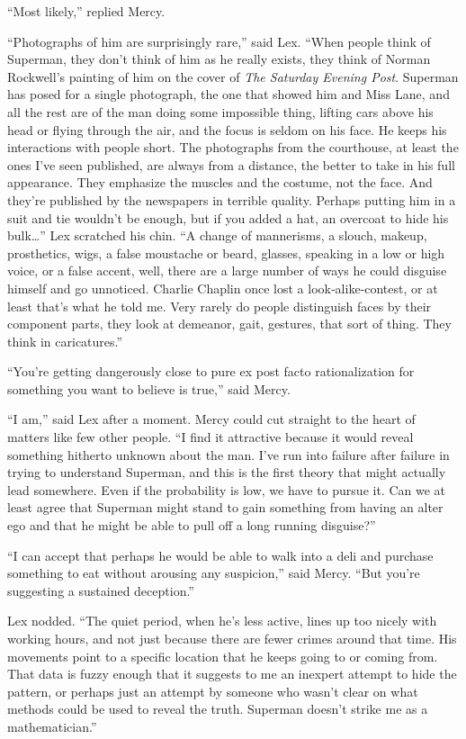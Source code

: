 \documentclass[ebook,12pt]{memoir}
\begin{document}
``Most likely,'' replied Mercy.

``Photographs of him are surprisingly rare,'' said Lex. ``When people
think of Superman, they don't think of him as he really exists, they
think of Norman Rockwell's painting of him on the cover of \emph{The
Saturday Evening Post}. Superman has posed for a single photograph, the
one that showed him and Miss Lane, and all the rest are of the man doing
some impossible thing, lifting cars above his head or flying through the
air, and the focus is seldom on his face. He keeps his interactions with
people short. The photographs from the courthouse, at least the ones
I've seen published, are always from a distance, the better to take in
his full appearance. They emphasize the muscles and the costume, not the
face. And they're published by the newspapers in terrible quality.
Perhaps putting him in a suit and tie wouldn't be enough, but if you
added a hat, an overcoat to hide his bulk\ldots{}'' Lex scratched his
chin. ``A change of mannerisms, a slouch, makeup, prosthetics, wigs, a
false moustache or beard, glasses, speaking in a low or high voice, or a
false accent, well, there are a large number of ways he could disguise
himself and go unnoticed. Charlie Chaplin once lost a
look‐alike‐contest, or at least that's what he told me. Very rarely do
people distinguish faces by their component parts, they look at
demeanor, gait, gestures, that sort of thing. They think in
caricatures.''

``You're getting dangerously close to pure ex post facto rationalization
for something you want to believe is true,'' said Mercy.

``I am,'' said Lex after a moment. Mercy could cut straight to the heart
of matters like few other people. ``I find it attractive because it
would reveal something hitherto unknown about the man. I've run into
failure after failure in trying to understand Superman, and this is the
first theory that might actually lead somewhere. Even if the probability
is low, we have to pursue it. Can we at least agree that Superman might
stand to gain something from having an alter ego and that he might be
able to pull off a long running disguise?''

``I can accept that perhaps he would be able to walk into a deli and
purchase something to eat without arousing any suspicion,'' said Mercy.
``But you're suggesting a sustained deception.''

Lex nodded. ``The quiet period, when he's less active, lines up too
nicely with working hours, and not just because there are fewer crimes
around that time. His movements point to a specific location that he
keeps going to or coming from. That data is fuzzy enough that it
suggests to me an inexpert attempt to hide the pattern, or perhaps just
an attempt by someone who wasn't clear on what methods could be used to
reveal the truth. Superman doesn't strike me as a mathematician.''
\end{document}

